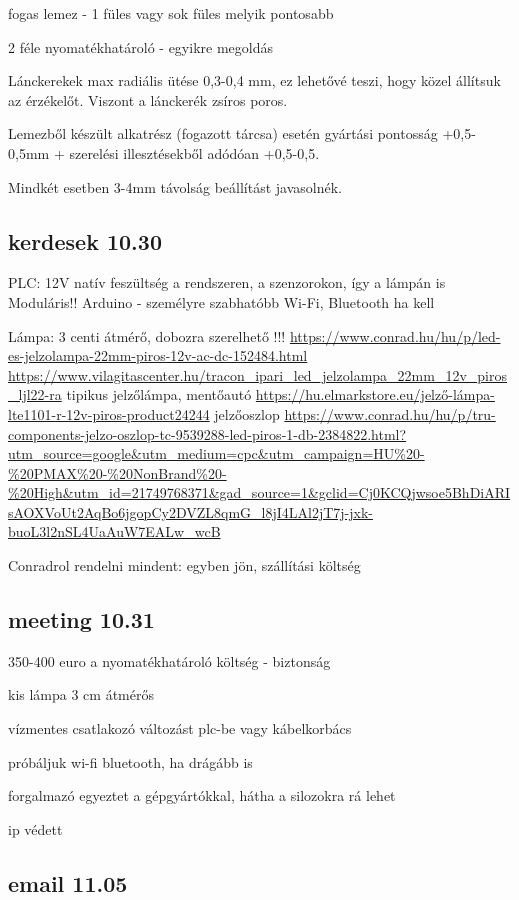 \documentclass{article}
\begin{document}
	fogas lemez - 1 füles vagy sok füles melyik pontosabb
	
	2 féle nyomatékhatároló - egyikre megoldás
	
	Lánckerekek max radiális ütése 0,3-0,4 mm, ez lehetővé teszi, hogy közel állítsuk az érzékelőt. Viszont a lánckerék zsíros poros.
	
	Lemezből készült alkatrész (fogazott tárcsa) esetén gyártási pontosság +0,5-0,5mm + szerelési illesztésekből adódóan +0,5-0,5.
	
	Mindkét esetben 3-4mm távolság beállítást javasolnék. 
	
	\subsection{kerdesek 10.30}
	
	PLC: 12V
	natív feszültség a rendszeren, a szenzorokon, így a lámpán is
	Moduláris!!
	Arduino - személyre szabhatóbb
	Wi-Fi, Bluetooth ha kell
	
	Lámpa:
	3 centi átmérő, dobozra szerelhető !!!
	\url{https://www.conrad.hu/hu/p/led-es-jelzolampa-22mm-piros-12v-ac-dc-152484.html}
	\url{https://www.vilagitascenter.hu/tracon_ipari_led_jelzolampa_22mm_12v_piros_ljl22-ra}
	tipikus jelzőlámpa, mentőautó 
	\url{https://hu.elmarkstore.eu/jelző-lámpa-lte1101-r-12v-piros-product24244}
	jelzőoszlop \url{https://www.conrad.hu/hu/p/tru-components-jelzo-oszlop-tc-9539288-led-piros-1-db-2384822.html?utm_source=google&utm_medium=cpc&utm_campaign=HU%20-%20PMAX%20-%20NonBrand%20-%20High&utm_id=21749768371&gad_source=1&gclid=Cj0KCQjwsoe5BhDiARIsAOXVoUt2AqBo6jgopCy2DVZL8qmG_l8jI4LAl2jT7j-jxk-buoL3l2nSL4UaAuW7EALw_wcB}
	
	Conradrol rendelni mindent: egyben jön, szállítási költség	
	
	\subsection{meeting 10.31}
	
	350-400 euro a nyomatékhatároló
	költség - biztonság
	
	kis lámpa 3 cm átmérős 
	
	vízmentes csatlakozó változást
	plc-be vagy kábelkorbács
	
	próbáljuk wi-fi bluetooth, ha drágább is
	
	forgalmazó egyeztet a gépgyártókkal, hátha a silozokra rá lehet
	
	ip védett
	
	\subsection{email 11.05}
	
\end{document}
